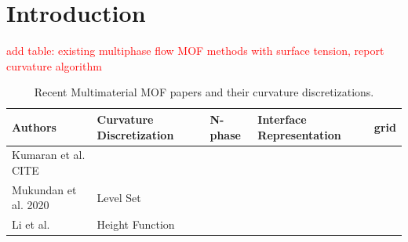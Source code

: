 \documentclass[preprint,12pt]{Definitions/elsarticle}
\begin{document}
\section{Introduction}
\textcolor{red}{add table: existing multiphase flow MOF methods with surface tension, report curvature algorithm}

\noindent{}


\begin{table}[H]
	\small
	\centering
	\caption{Recent Multimaterial MOF papers and their curvature discretizations.}
	\renewcommand{\arraystretch}{1.2} 
	\begin{tabular}{|l|l|l|l|l|}
		\hline
		Authors   & Curvature Discretization  & N-phase & Interface Representation & grid \\ \hline
		Kumaran et al. CITE &  & &  \\
		Mukundan et al. 2020 \cite{mukundan2020MOF}  & Level Set  & &  \\
		Li et al.\cite{LiETAL2015IncompressibleMultiphase} & Height Function & &  \\
		\hline
	\end{tabular}
	\label{curvaturediscretization_comparison}
\end{table}
\end{document}
